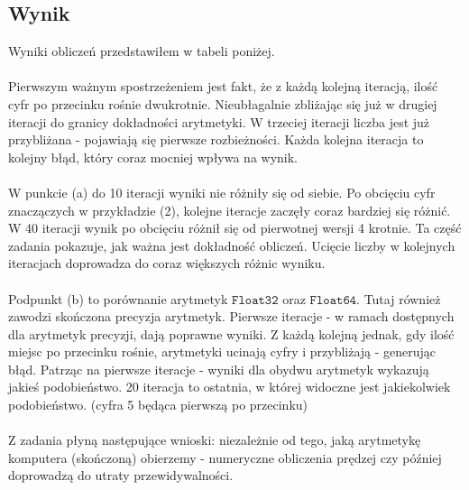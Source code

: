 \subsection{Wynik}
Wyniki obliczeń przedstawiłem w tabeli poniżej. \\\\
Pierwszym ważnym spostrzeżeniem jest fakt, że z każdą kolejną iteracją, ilość cyfr po przecinku rośnie dwukrotnie. Nieubłagalnie zbliżając się już w drugiej iteracji do granicy dokładności arytmetyki. W trzeciej iteracji liczba jest już przybliżana - pojawiają się pierwsze rozbieżności. Każda kolejna iteracja to kolejny błąd, który coraz mocniej wpływa na wynik. \\\\
W punkcie (a) do 10 iteracji wyniki nie różniły się od siebie. Po obcięciu cyfr znaczączych w przykładzie (2), kolejne iteracje zaczęły coraz bardziej się różnić. W 40 iteracji wynik po obcięciu różnił się od pierwotnej wersji 4 krotnie. Ta część zadania pokazuje, jak ważna jest dokładność obliczeń. Ucięcie liczby w kolejnych iteracjach doprowadza do coraz większych różnic wyniku. \\\\
Podpunkt (b) to porównanie arytmetyk $ \mathtt{Float32} $ oraz $ \mathtt{Float64} $. Tutaj również zawodzi skończona precyzja arytmetyk. Pierwsze iteracje - w ramach dostępnych dla arytmetyk precyzji, dają poprawne wyniki. Z każdą kolejną jednak, gdy ilość miejsc po przecinku rośnie, arytmetyki ucinają cyfry i przybliżają - generując błąd. Patrząc na pierwsze iteracje - wyniki dla obydwu arytmetyk wykazują jakieś podobieństwo. 20 iteracja to ostatnia, w której widoczne jest jakiekolwiek podobieństwo. (cyfra 5 będąca pierwszą po przecinku) \\\\
Z zadania płyną następujące wnioski: niezależnie od tego, jaką arytmetykę komputera (skończoną) obierzemy - numeryczne obliczenia prędzej czy później doprowadzą do utraty przewidywalności.
\newpage
\begin{center}
    
\end{center}